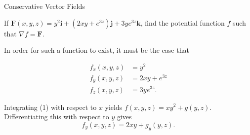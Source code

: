 \documentclass[11pt,english,
handout
]{beamer}
\begin{document}
%
%
%
%
%
%
%
%


%
%
%
%
%








\begin{frame}[t]{Conservative Vector Fields}
\small

\begin{example}
If $\mathbf{F}(x,y,z)=y^2\mathbf{i}+(2xy+e^{3z})\mathbf{j}+3ye^{3z}\mathbf{k}$, find the potential function $f$ such that $\nabla f=\mathbf{F}$.\pause

\lspace
In order for such a function to exist, it must be the case that

\begin{align}
f_x(x,y,z)&=y^2 \tag{1}\\[2mm]
f_y(x,y,z)&=2xy+e^{3z} \tag{2}\\[2mm]
f_z(x,y,z)&=3ye^{3z}.\tag{3}
\end{align}\pause 

Integrating (1) with respect to \uline{$x$} yields $f(x,y,z)=xy^2+g(y,z)$. \pause Differentiating this with respect to $y$ gives
\[
f_y(x,y,z)=2xy+g_y(y,z).
\]
\end{example}
\end{frame}
\end{document}
